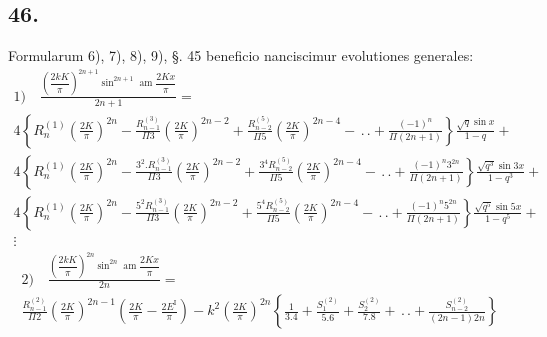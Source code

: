 \documentclass{article}
\begin{document}
\subsection*{46.}
Formularum 6), 7), 8), 9), §. 45 beneficio nanciscimur evolutiones generales:
\[
\begin{gathered}
\text{1)}\quad\frac{\left(\dfrac{2kK}{\pi}\right)^{2n+1}\sin^{2n+1}\operatorname{am}\dfrac{2Kx}{\pi}}{2n+1}=\\[1.5ex]
4\left\{R_{n}^{(1)}\left(\frac{2K}{\pi}\right)^{2n}-\frac{R_{n-1}^{(3)}}{\Pi 3}\left(\frac{2K}{\pi}\right)^{2n-2}+\frac{R_{n-2}^{(5)}}{\Pi 5}\left(\frac{2K}{\pi}\right)^{2n-4}-\,.\,.+\frac{(-1)^{n}}{\Pi(2n+1)}\right\}\frac{\sqrt{q}\sin x}{1-q}+\\[1.5ex]
4\left\{R_{n}^{(1)}\left(\frac{2K}{\pi}\right)^{2n}-\frac{3^{2}.R_{n-1}^{(3)}}{\Pi 3}\left(\frac{2K}{\pi}\right)^{2n-2}+\frac{3^{4}R_{n-2}^{(5)}}{\Pi 5}\left(\frac{2K}{\pi}\right)^{2n-4}-\,.\,.+\frac{(-1)^{n}3^{2n}}{\Pi(2n+1)}\right\}\frac{\sqrt{q^{3}}\sin 3x}{1-q^{3}}+\\[1.5ex]
4\left\{R_{n}^{(1)}\left(\frac{2K}{\pi}\right)^{2n}-\frac{5^{2}R_{n-1}^{(3)}}{\Pi 3}\left(\frac{2K}{\pi}\right)^{2n-2}+\frac{5^{4}R_{n-2}^{(5)}}{\Pi 5}\left(\frac{2K}{\pi}\right)^{2n-4}-\,.\,.+\frac{(-1)^{n}5^{2n}}{\Pi(2n+1)}\right\}\frac{\sqrt{q^{5}}\sin 5x}{1-q^{5}}+\\[1.5ex]
\vdots
\end{gathered}
\]
\[
\begin{gathered}
\text{2)}\quad\frac{\left(\dfrac{2kK}{\pi}\right)^{2n}\sin^{2n}\operatorname{am}\dfrac{2Kx}{\pi}}{2n}=\\[1.5ex]
\frac{R_{n-1}^{(2)}}{\Pi 2}\left(\frac{2K}{\pi}\right)^{2n-1}\left(\frac{2K}{\pi}-\frac{2E^{\mathrm{I}}}{\pi}\right)-k^{2}\left(\frac{2K}{\pi}\right)^{2n}\left\{\frac{1}{3.4}+\frac{S_{1}^{(2)}}{5.6}+\frac{S_{2}^{(2)}}{7.8}+\,.\,.+\frac{S_{n-2}^{(2)}}{(2n-1)2n}\right\}
\end{gathered}
\]
\end{document}

